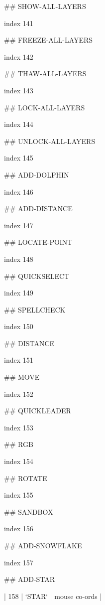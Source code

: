 ## SHOW-ALL-LAYERS

index 141



## FREEZE-ALL-LAYERS

index 142



## THAW-ALL-LAYERS

index 143



## LOCK-ALL-LAYERS

index 144



## UNLOCK-ALL-LAYERS

index 145



## ADD-DOLPHIN

index 146



## ADD-DISTANCE

index 147



## LOCATE-POINT

index 148



## QUICKSELECT

index 149



## SPELLCHECK

index 150



## DISTANCE

index 151



## MOVE

index 152



## QUICKLEADER

index 153



## RGB

 index 154



## ROTATE

index 155



## SANDBOX

index 156



## ADD-SNOWFLAKE

index 157



## ADD-STAR

| 158 | `STAR` | mouse co-ords |


